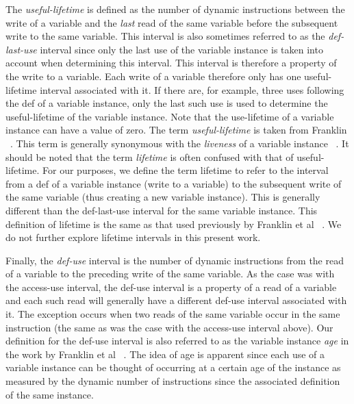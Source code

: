 \documentclass[10pt,dvips]{article}
\begin{document}
The \textit{useful-lifetime} is defined as the number of
dynamic instructions between the write of a variable
and the \textit{last} read of the same variable before the
subsequent write to the same variable.
This interval is also sometimes referred to as the \textit{def-last-use}
interval since only the last use of the variable instance is taken
into account when determining this interval.
This interval is therefore a property of the write to a variable.
Each write of a variable therefore only has one
useful-lifetime interval associated with it.
If there are, for example, three uses following the
def of a variable instance, only the last such use is
used to determine the useful-lifetime of the variable instance.
Note that the use-lifetime of a variable instance can have a value of 
zero.
The term \textit{useful-lifetime} is taken from Franklin ~\cite{Franklin92}.
This term is generally synonymous with the \textit{liveness} of
a variable instance ~\cite{hennpatt95}.
It should be noted that the term \textit{lifetime} is often confused
with that of useful-lifetime.
For our purposes, we define the term lifetime to refer to
the interval from a def of a variable instance (write to a variable)
to the
subsequent write of the same variable (thus creating a new
variable instance).
This is generally different than the def-last-use interval
for the same variable instance.
This definition of lifetime is the same as that used previously by
Franklin et al ~\cite{Franklin92}.
We do not further explore lifetime intervals in this
present work.

Finally, the \textit{def-use} interval is the number of
dynamic
instructions from the read of a variable to the preceding write
of the same variable.
As the case was with the access-use interval,
the def-use interval is a property of a read of a variable
and each such read will generally have a 
different def-use interval associated with it.
The exception occurs when two reads of the same variable occur in 
the same instruction (the
same as was the case with the access-use interval above).
Our definition for the def-use interval is also referred to
as the variable instance \textit{age} in the work by 
Franklin et al ~\cite{Franklin92}.
The idea of age is apparent since each use of a variable instance
can be thought of occurring at a certain age of the instance as
measured by the dynamic number of instructions since the associated
definition of the same instance.
\end{document}
